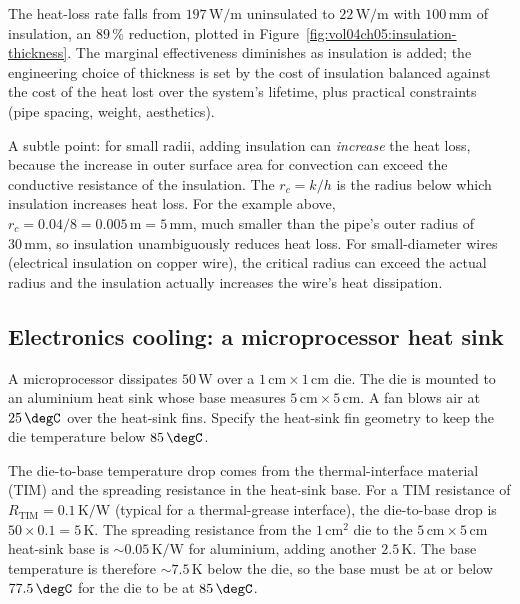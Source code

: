 

The heat-loss rate falls from $197\,\text{W}/\text{m}$ uninsulated to
$22\,\text{W}/\text{m}$ with $100\,\si{\milli\meter}$ of insulation, an
$89\,\%$ reduction, plotted in
Figure~\ref{fig:vol04ch05:insulation-thickness}. The marginal
effectiveness diminishes as
insulation is added; the engineering choice of thickness is set by
the cost of insulation balanced against the cost of the heat lost
over the system's lifetime, plus practical constraints (pipe spacing,
weight, aesthetics).

A subtle point: for small radii, adding insulation can \emph{increase}
the heat loss, because the increase in outer surface area for
convection can exceed the conductive resistance of the insulation. The
 $r_c = k/h$ is the radius below
which insulation increases heat loss. For the example above, $r_c =
0.04/8 = 0.005\,\text{m} = 5\,\si{\milli\meter}$, much smaller than
the pipe's outer radius of $30\,\si{\milli\meter}$, so insulation
unambiguously reduces heat loss. For small-diameter wires (electrical
insulation on copper wire), the critical radius can exceed the
actual radius and the insulation actually increases the wire's heat
dissipation.

\subsection{Electronics cooling: a microprocessor heat sink}

A microprocessor dissipates $50\,\text{W}$ over a $1\,\si{\centi\meter}
\times 1\,\si{\centi\meter}$ die. The die is mounted to an aluminium
heat sink whose base measures $5\,\si{\centi\meter} \times 5\,\si{
\centi\meter}$. A fan blows air at $25\,\degC$ over the heat-sink
fins. Specify the heat-sink fin geometry to keep the die temperature
below $85\,\degC$.

The die-to-base temperature drop comes from the thermal-interface
material (TIM) and the spreading resistance in the heat-sink base.
For a TIM resistance of $R_{\text{TIM}} = 0.1\,\si{\kelvin}/\text{W}$
(typical for a thermal-grease interface), the die-to-base drop is
$50 \times 0.1 = 5\,\si{\kelvin}$. The spreading resistance from the
$1\,\si{\centi\meter}^2$ die to the $5\,\si{\centi\meter} \times 5\,\si{
\centi\meter}$ heat-sink base is $\sim 0.05\,\si{\kelvin}/\text{W}$ for
aluminium, adding another $2.5\,\si{\kelvin}$. The base temperature is
therefore $\sim 7.5\,\si{\kelvin}$ below the die, so the base must be
at or below $77.5\,\degC$ for the die to be at $85\,\degC$.

